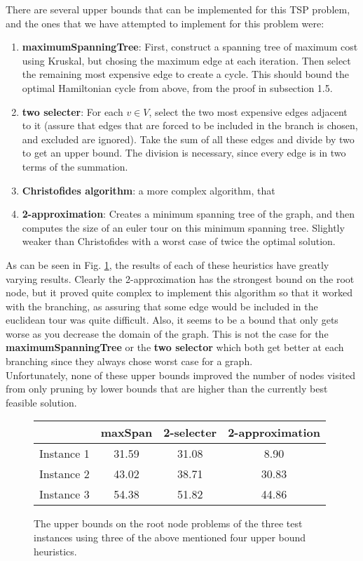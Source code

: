 \documentclass[12pt]{article}
\begin{document}
There are several upper bounds that can be implemented for this TSP problem, and the ones that we have attempted to implement for this problem were:
\begin{enumerate}
\item {\bf maximumSpanningTree}: First, construct a spanning tree of maximum cost using Kruskal, but chosing the maximum edge at each iteration. Then select the remaining most expensive edge to create a cycle. This should bound the optimal Hamiltonian cycle from above, from the proof in subsection 1.5.
\item {\bf two selecter}: For each $v\in V$, select the two most expensive edges adjacent to it (assure that edges that are forced to be included in the branch is chosen, and excluded are ignored). Take the sum of all these edges and divide by two to get an upper bound. The division is necessary, since every edge is in two terms of the summation.
\item {\bf Christofides algorithm}: a more complex algorithm, that 
\item {\bf 2-approximation}: Creates a minimum spanning tree of the graph, and then computes the size of an euler tour on this minimum spanning tree. Slightly weaker than Christofides with a worst case of twice the optimal solution.
\end{enumerate}

As can be seen in Fig. \ref{upperbounds}, the results of each of these heuristics have greatly varying results. Clearly the 2-approximation has the strongest bound on the root node, but it proved quite complex to implement this algorithm so that it worked with the branching, as assuring that some edge would be included in the euclidean tour was quite difficult. Also, it seems to be a bound that only gets worse as you decrease the domain of the graph. This is not the case for the {\bf maximumSpanningTree} or the {\bf two selector} which both get better at each branching since they always chose worst case for a graph.\\

Unfortunately, none of these upper bounds improved the number of nodes visited from only pruning by lower bounds that are higher than the currently best feasible solution. 
\begin{figure}
\begin{tabular}{|c|c|c|c|}
\hline
&maxSpan & 2-selecter & 2-approximation\\
\hline
Instance 1 & 31.59 & 31.08 & 8.90 \\
\hline
Instance 2 & 43.02 & 38.71 & 30.83\\
\hline
Instance 3 & 54.38 & 51.82 & 44.86\\
\hline
\end{tabular}
\caption{The upper bounds on the root node problems of the three test instances using three of the above mentioned four upper bound heuristics.\label{upperbounds}}
\end{figure}
\end{document}
